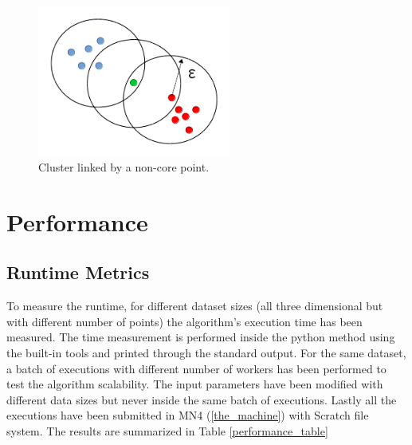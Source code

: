 \documentclass[10pt,journal,compsoc]{IEEEtran}
\let\MYoriglatexcaption\caption
\renewcommand{\caption}[2][\relax]{\MYoriglatexcaption[#2]{#2}}
\begin{document}
\begin{itemize}
\begin{figure}[!h]
\centering
\includegraphics[width=2.5in]{img/test_case2.png}
\caption{Cluster linked by a non-core point.}
\label{test_case2}
\end{figure}
\end{itemize}

\section{Performance} \label{performance}

\subsection{Runtime Metrics}

To measure the runtime, for different dataset sizes (all three dimensional but with different number of points) the algorithm's execution time has been measured. The time measurement is performed inside the python method using the built-in tools and printed through the standard output. For the same dataset, a batch of executions with different number of workers has been performed to test the algorithm scalability. The input parameters have been modified with different data sizes but never inside the same batch of executions. Lastly all the executions have been submitted in MN4 (\ref{the_machine}) with Scratch file system. The results are summarized in Table \ref{performance_table}
\end{document}
